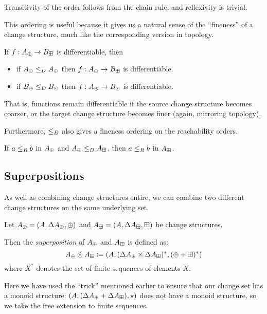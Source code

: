 Transitivity of the order follows from the chain rule, and reflexivity is trivial.

This ordering is useful because it gives us a natural sense of the ``fineness''
of a change structure, much like the corresponding version in topology.

\begin{prop}
  If $f: A_\oplus \rightarrow B_\boxplus$ is differentiable, then
  \begin{itemize}
    \item if $A_\odot \leq_D A_\oplus$ then $f: A_\odot \rightarrow
      B_\boxplus$ is differentiable.
    \item if $B_\oplus \leq_D B_\odot$ then $f: A_\oplus \rightarrow
      B_\odot$ is differentiable.
  \end{itemize}
\end{prop}

That is, functions remain differentiable if the source change structure becomes
coarser, or the target change structure becomes finer (again, mirroring topology).

Furthermore, $\leq_D$ also gives a fineness ordering on the reachability orders.

\begin{prop}
  If $a \leq_R b$ in $A_\oplus$ and $A_\oplus \leq_D A_\boxplus$, then $a \leq_R b$ in $A_\boxplus$.
\end{prop}

\subsection{Superpositions}

As well as combining change structures entire, we can combine two different
change structures on the same underlying set.

\begin{defn}[Superposition]
  Let $A_\oplus = (A,\Delta A_\oplus,\oplus)$ and $A_\boxplus =
  (A,\Delta A_\boxplus,\boxplus)$ be change structures.

  Then the \textit{superposition} of $A_\oplus$ and $A_\boxplus$ is defined as:
  $$A_\oplus \circledast A_\boxplus \coloneqq (A,
    (\Delta A_\oplus \times \Delta A_\boxplus)^\ast,(\oplus + \boxplus)^\ast)$$
  where $X^\ast$ denotes the set of finite sequences of elements $X$.
\end{defn}

Here we have used the ``trick'' mentioned earlier to ensure that our change
set has a monoid structure: $(A,(\Delta A_\oplus +
  \Delta A_\boxplus),\star)$ does not have a monoid structure, so we take
the free extension to finite sequences.

